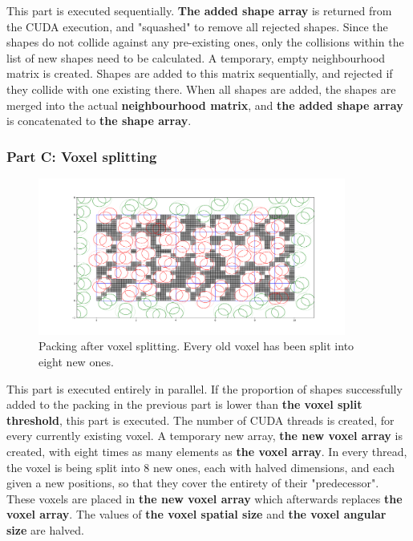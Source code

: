 \documentclass[12pt, oneside]{report}
\begin{document}
This part is executed sequentially. \newline
\textbf{The added shape array} is returned from the CUDA execution, and "squashed" to remove all rejected shapes. Since the shapes do not collide against any pre-existing ones, only the collisions within the list of new shapes need to be calculated. A temporary, empty neighbourhood matrix is created. Shapes are added to this matrix sequentially, and rejected if they collide with one existing there. When all shapes are added, the shapes are merged into the actual \textbf{neighbourhood matrix}, and \textbf{the added shape array} is concatenated to \textbf{the shape array}.

\subsubsection{Part C: Voxel splitting}

\begin{figure}[H]
  \centering
	\includegraphics[width=0.9\textwidth,keepaspectratio]{Images/GPURSA/Figure_5.pdf}
	\caption{Packing after voxel splitting. Every old voxel has been split into eight new ones.}
	\label{GPURSA_Process_5}
\end{figure}

This part is executed entirely in parallel. \newline
If the proportion of shapes successfully added to the packing in the previous part is lower than \textbf{the voxel split threshold}, this part is executed. \newline
The number of CUDA threads is created, for every currently existing voxel. A temporary new array, \textbf{the new voxel array} is created, with eight times as many elements as \textbf{the voxel array}. In every thread, the voxel is being split into 8 new ones, each with halved dimensions, and each given a new positions, so that they cover the entirety of their "predecessor". These voxels are placed in \textbf{the new voxel array} which afterwards replaces \textbf{the voxel array}.
The values of \textbf{the voxel spatial size} and \textbf{the voxel angular size} are halved.
\end{document}
